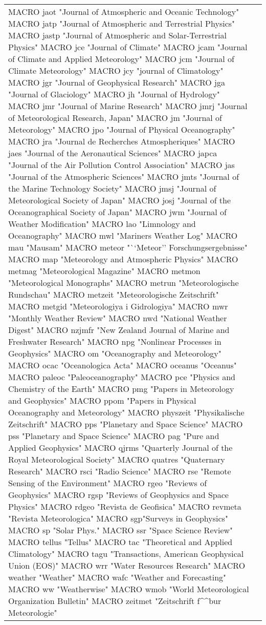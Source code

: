 \documentclass{article}
\begin{document}
\begin{longtable}{lp{6cm}}
MACRO {jaot} {"Journal of Atmospheric and Oceanic Technology"}
MACRO {jatp} {"Journal of Atmospheric and Terrestrial Physics"}
MACRO {jastp} {"Journal of Atmospheric and Solar-Terrestrial Physics"}
MACRO {jce} {"Journal of Climate"}
MACRO {jcam} {"Journal of Climate and Applied Meteorology"}
MACRO {jcm} {"Journal of Climate Meteorology"}
MACRO {jcy} {"journal of Climatology"}
MACRO {jgr} {"Journal of Geophysical Research"}
MACRO {jga} {"Journal of Glaciology"}
MACRO {jh} {"Journal of Hydrology"}
MACRO {jmr} {"Journal of Marine Research"}
MACRO {jmrj} {"Journal of Meteorological Research, Japan"}
MACRO {jm} {"Journal of Meteorology"}
MACRO {jpo} {"Journal of Physical Oceanography"}
MACRO {jra} {"Journal de Recherches Atmospheriques"}
MACRO {jaes} {"Journal of the Aeronautical Sciences"}
MACRO {japca} {"Journal of the Air Pollution Control Association"}
MACRO {jas} {"Journal of the Atmospheric Sciences"}
MACRO {jmts} {"Journal of the Marine Technology Society"}
MACRO {jmsj} {"Journal of Meteorological Society of Japan"}
MACRO {josj} {"Journal of the Oceanographical Society of Japan"}
MACRO {jwm} {"Journal of Weather Modification"}
MACRO {lao} {"Limnology and Oceanography"}
MACRO {mwl} {"Mariners Weather Log"}
MACRO {mau} {"Mausam"}
MACRO {meteor} {"``Meteor'' Forschungsergebnisse"}
MACRO {map} {"Meteorology and Atmospheric Physics"}
MACRO {metmag} {"Meteorological Magazine"}
MACRO {metmon} {"Meteorological Monographs"}
MACRO {metrun} {"Meteorologische Rundschau"}
MACRO {metzeit} {"Meteorologische Zeitschrift"}
MACRO {metgid} {"Meteorologiya i Gidrologiya"}
MACRO {mwr} {"Monthly Weather Review"}
MACRO {nwd} {"National Weather Digest"}
MACRO {nzjmfr} {"New Zealand Journal of Marine and Freshwater Research"}
MACRO {npg} {"Nonlinear Processes in Geophysics"}
MACRO {om} {"Oceanography and Meteorology"}
MACRO {ocac} {"Oceanologica Acta"}
MACRO {oceanus} {"Oceanus"}
MACRO {paleoc} {"Paleoceanography"}
MACRO {pce} {"Physics and Chemistry of the Earth"}
MACRO {pmg} {"Papers in Meteorology and Geophysics"}
MACRO {ppom} {"Papers in Physical Oceanography and Meteorology"}
MACRO {physzeit} {"Physikalische Zeitschrift"}
MACRO {pps} {"Planetary and Space Science"}
MACRO {pss} {"Planetary and Space Science"}
MACRO {pag} {"Pure and Applied Geophysics"}
MACRO {qjrms} {"Quarterly Journal of the Royal Meteorological Society"}
MACRO {quatres} {"Quaternary Research"}
MACRO {rsci} {"Radio Science"}
MACRO {rse} {"Remote Sensing of the Environment"}
MACRO {rgeo} {"Reviews of Geophysics"}
MACRO {rgsp} {"Reviews of Geophysics and Space Physics"}
MACRO {rdgeo} {"Revista de Geofisica"}
MACRO {revmeta} {"Revista Meteorologica"}
MACRO {sgp}{"Surveys in Geophysics"}
MACRO {sp} {"Solar Phys."}
MACRO {ssr} {"Space Science Review"}
MACRO {tellus} {"Tellus"}
MACRO {tac} {"Theoretical and Applied Climatology"}
MACRO {tagu} {"Transactions, American Geophysical Union (EOS)"}
MACRO {wrr} {"Water Resources Research"}
MACRO {weather} {"Weather"}
MACRO {wafc} {"Weather and Forecasting"}
MACRO {ww} {"Weatherwise"}
MACRO {wmob} {"World Meteorological Organization Bulletin"}
MACRO {zeitmet} {"Zeitschrift f\^^b{u}r Meteorologie"}


\end{longtable}
\end{document}
